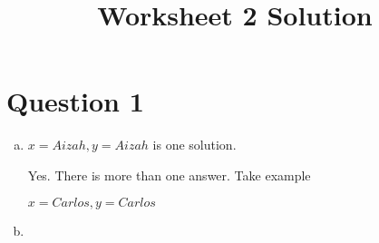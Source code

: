 \documentclass[12pt]{article}
\begin{document}
\title{Worksheet 2 Solution}
\maketitle

\section*{Question 1}

\begin{enumerate}[a)]
    \item
        $x = Aizah, y = Aizah$ is one solution.

        \bigskip

        Yes. There is more than one answer. Take example

        $x = Carlos, y = Carlos$

    \bigskip

    \item

\end{enumerate}
\end{document}
